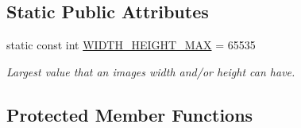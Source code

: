 \subsection*{Static Public Attributes}
\begin{DoxyCompactItemize}
\item 
static const int \mbox{\hyperlink{classsgl_1_1GCanvas_a9150dbfb90e715487461a8c07850871e}{W\+I\+D\+T\+H\+\_\+\+H\+E\+I\+G\+H\+T\+\_\+\+M\+AX}} = 65535
\begin{DoxyCompactList}\small\item\em Largest value that an image\textquotesingle{}s width and/or height can have. \end{DoxyCompactList}\end{DoxyCompactItemize}
\subsection*{Protected Member Functions}

